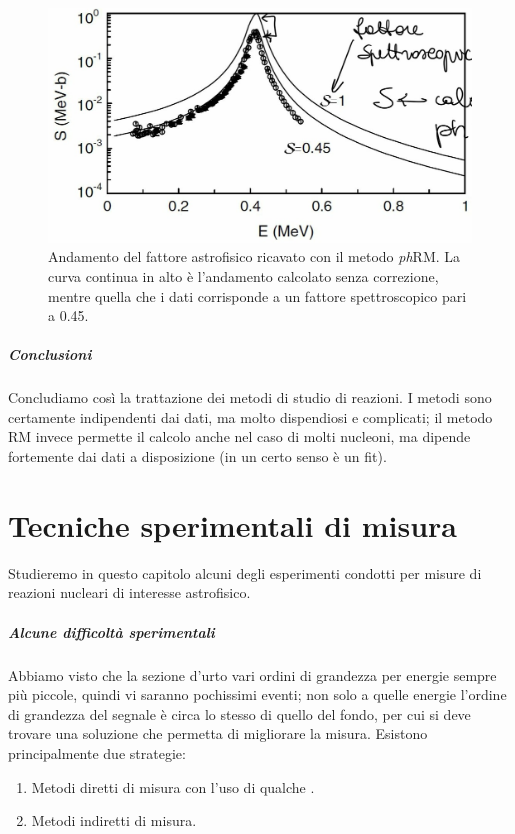 \begin{figure}[h]
	\centering
	\includegraphics[scale=0.3]{Immagini/0414_RM2.png}
	\caption{Andamento del fattore astrofisico ricavato con il metodo \textit{ph}RM. La curva continua in alto è l'andamento calcolato senza correzione, mentre quella che  i dati corrisponde a un fattore spettroscopico pari a 0.45.}
	\label{0414_phRM2}
\end{figure}
\newpage
\paragraph{Conclusioni} Concludiamo così la trattazione dei metodi di studio di reazioni. I metodi  sono certamente indipendenti dai dati, ma molto dispendiosi e complicati; il metodo RM invece permette il calcolo anche nel caso di molti nucleoni, ma dipende fortemente dai dati a disposizione (in un certo senso è un fit). 



\chapter{Tecniche sperimentali di misura}
Studieremo in questo capitolo alcuni degli esperimenti condotti per misure di reazioni nucleari di interesse astrofisico.
\paragraph{Alcune difficoltà sperimentali} 
Abbiamo visto che la sezione d'urto  vari ordini di grandezza per energie sempre più piccole, quindi vi saranno pochissimi eventi; non solo a quelle energie l'ordine di grandezza del segnale è circa lo stesso di quello del fondo, per cui si deve trovare una soluzione che permetta di migliorare la misura. Esistono principalmente due strategie:
\begin{enumerate}
	\item Metodi diretti di misura con l'uso di qualche .
	\item Metodi indiretti di misura.
\end{enumerate}

